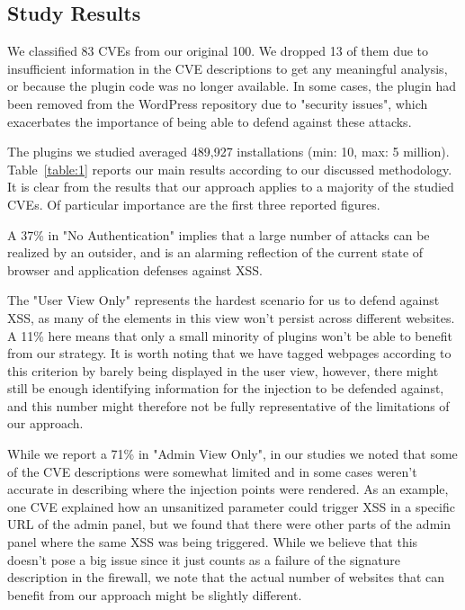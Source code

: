 \subsection{Study Results}

We classified 83 CVEs from our original 100. We dropped 13 of them due to insufficient information in the CVE descriptions to get any meaningful analysis, or because the plugin code was no longer available. In some cases, the plugin had been removed from the WordPress repository due to "security issues", which exacerbates the importance of being able to defend against these attacks.  

The plugins we studied averaged 489,927 installations (min: 10, max: 5 million). Table~\ref{table:1} reports our main results according to our discussed methodology. It is clear from the results that our approach applies to a majority of the studied CVEs. Of particular importance are the first three reported figures.

 A 37\% in "No Authentication" implies that a large number of attacks can be realized by an outsider, and is an alarming reflection of the current state of browser and application defenses against XSS. 
 
 The "User View Only" represents the hardest scenario for us to defend against XSS, as many of the elements in this view won't persist across different websites. A 11\% here means that only a small minority of plugins won't be able to benefit from our strategy. It is worth noting that we have tagged webpages according to this criterion by barely being displayed in the user view, however, there might still be enough identifying information for the injection  to be defended against, and this number might therefore not be fully representative of the limitations of our approach.
 
  While we report a 71\% in "Admin View Only", in our studies we noted that some of the CVE descriptions were somewhat limited and in some cases weren't accurate in describing where the injection points were rendered. As an example, one CVE explained how an unsanitized parameter could trigger XSS in a specific URL of the admin panel, but we found that there were other parts of the admin panel where the same XSS was being triggered. While we believe that this doesn't pose a big issue since it just counts as a failure of the signature description in the firewall, we note that the actual number of websites that can benefit from our approach might be slightly different. 
 
